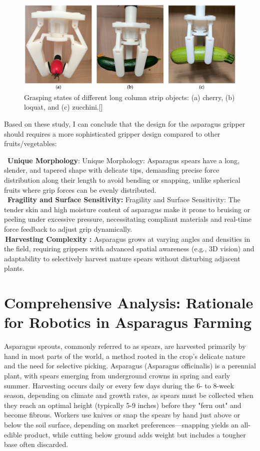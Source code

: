 \begin{figure}
    \centering
    \includegraphics[width=1\linewidth]{pictures/gripper_different_shape.png}
    \caption{Grasping states of different long column strip objects: (a) cherry, (b) loquat, and (c) zucchini.[\cite{multipurpuse_gripper}]}
    \label{fig:enter-label}
\end{figure}

Based on these study, I can conclude that the design for the asparagus gripper should requires a more sophisticated gripper design compared to other fruits/vegetables:

\textbullet \,\textbf{ Unique Morphology}:
Unique Morphology: Asparagus spears have a long, slender, and tapered shape with delicate tips, demanding precise force distribution along their length to avoid bending or snapping, unlike spherical fruits where grip forces can be evenly distributed.\\
\textbullet \,\textbf{ Fragility and Surface Sensitivity:}
Fragility and Surface Sensitivity: The tender skin and high moisture content of asparagus make it prone to bruising or peeling under excessive pressure, necessitating compliant materials and real-time force feedback to adjust grip dynamically.\\
\textbullet \,\textbf{Harvesting Complexity :}
 Asparagus grows at varying angles and densities in the field, requiring grippers with advanced spatial awareness (e.g., 3D vision) and adaptability to selectively harvest mature spears without disturbing adjacent plants.


\section{Comprehensive Analysis: Rationale for \newline Robotics in Asparagus Farming}

Asparagus sprouts, commonly referred to as spears, are harvested primarily by hand in most parts of the world, a method rooted in the crop’s delicate nature and the need for selective picking. Asparagus (Asparagus officinalis) is a perennial plant, with spears emerging from underground crowns in spring and early summer. Harvesting occurs daily or every few days during the 6- to 8-week season, depending on climate and growth rates, as spears must be collected when they reach an optimal height (typically 5-9 inches) before they "fern out" and become fibrous. Workers use knives or snap the spears by hand just above or below the soil surface, depending on market preferences—snapping yields an all-edible product, while cutting below ground adds weight but includes a tougher base often discarded.


